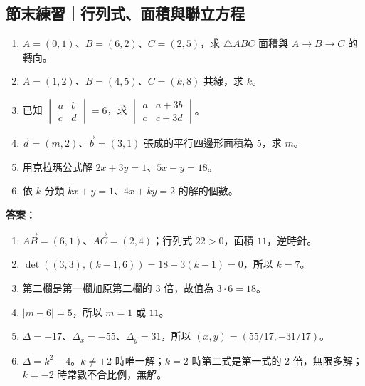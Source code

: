 \documentclass[11pt,a4paper]{article}
\providecommand{\tightlist}{%
  \setlength{\itemsep}{0pt}\setlength{\parskip}{0pt}}
\begin{document}
\begin{HandoutSelfCheck}

\subsection{節末練習｜行列式、面積與聯立方程}\label{ux7bc0ux672bux7df4ux7fd2ux884cux5217ux5f0fux9762ux7a4dux8207ux806fux7acbux65b9ux7a0b}

\begin{enumerate}
\def\labelenumi{\arabic{enumi}.}
\tightlist
\item
  \(A=(0,1)\)、\(B=(6,2)\)、\(C=(2,5)\)，求 \(\triangle ABC\) 面積與 \(A\to B\to C\) 的轉向。
\item
  \(A=(1,2)\)、\(B=(4,5)\)、\(C=(k,8)\) 共線，求 \(k\)。
\item
  已知 \(\begin{vmatrix}a&b\\c&d\end{vmatrix}=6\)，求 \(\begin{vmatrix}a&a+3b\\c&c+3d\end{vmatrix}\)。
\item
  \(\vec a=(m,2)\)、\(\vec b=(3,1)\) 張成的平行四邊形面積為 \(5\)，求 \(m\)。
\item
  用克拉瑪公式解 \(2x+3y=1\)、\(5x-y=18\)。
\item
  依 \(k\) 分類 \(kx+y=1\)、\(4x+ky=2\) 的解的個數。
\end{enumerate}

\textbf{答案：}

\begin{enumerate}
\def\labelenumi{\arabic{enumi}.}
\tightlist
\item
  \(\overrightarrow{AB}=(6,1)\)、\(\overrightarrow{AC}=(2,4)\)；行列式 \(22>0\)，面積 \(11\)，逆時針。
\item
  \(\det((3,3),(k-1,6))=18-3(k-1)=0\)，所以 \(k=7\)。
\item
  第二欄是第一欄加原第二欄的 \(3\) 倍，故值為 \(3\cdot6=18\)。
\item
  \(|m-6|=5\)，所以 \(m=1\) 或 \(11\)。
\item
  \(\Delta=-17\)、\(\Delta_x=-55\)、\(\Delta_y=31\)，所以 \((x,y)=(55/17,-31/17)\)。
\item
  \(\Delta=k^2-4\)。\(k\ne\pm2\) 時唯一解；\(k=2\) 時第二式是第一式的 \(2\) 倍，無限多解；\(k=-2\) 時常數不合比例，無解。
\end{enumerate}

\end{HandoutSelfCheck}
\end{document}
